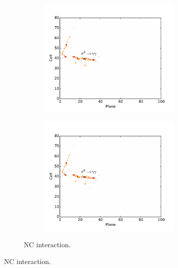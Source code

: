 \begin{figure}[t]
\begin{subfigure}[c]{\textwidth}
\centering
\begin{subfigure}[c]{0.47\textwidth}
\includegraphics[width=\textwidth]{figures/cnn/view_truetype13_caltype6_event144_x.pdf}
\vspace{-20pt}
\caption*{\xview}
\end{subfigure}
\begin{subfigure}[c]{0.47\textwidth}
\includegraphics[width=\textwidth]{figures/cnn/view_truetype13_caltype6_event144_x.pdf}
\vspace{-20pt}
\caption*{\yview}
\end{subfigure}
\vspace{-10pt}
\caption{NC interaction.}
\label{pixnc}
\end{subfigure}



\end{figure}
